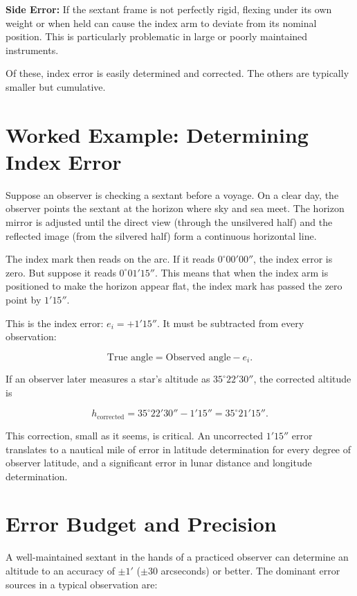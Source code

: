 \textbf{Side Error:} If the sextant frame is not perfectly rigid, flexing under its own weight or when held can cause the index arm to deviate from its nominal position. This is particularly problematic in large or poorly maintained instruments.

Of these, index error is easily determined and corrected. The others are typically smaller but cumulative.

\section{Worked Example: Determining Index Error}

Suppose an observer is checking a sextant before a voyage. On a clear day, the observer points the sextant at the horizon where sky and sea meet. The horizon mirror is adjusted until the direct view (through the unsilvered half) and the reflected image (from the silvered half) form a continuous horizontal line.

The index mark then reads on the arc. If it reads $0^{\circ} 00' 00''$, the index error is zero. But suppose it reads $0^{\circ} 01' 15''$. This means that when the index arm is positioned to make the horizon appear flat, the index mark has passed the zero point by $1' 15''$.

This is the index error: $e_i = +1' 15''$. It must be subtracted from every observation:

\[
  \text{True angle} = \text{Observed angle} - e_i.
\]

If an observer later measures a star's altitude as $35^{\circ} 22' 30''$, the corrected altitude is

\[
  h_{\text{corrected}} = 35^{\circ} 22' 30'' - 1' 15'' = 35^{\circ} 21' 15''.
\]

This correction, small as it seems, is critical. An uncorrected $1' 15''$ error translates to a nautical mile of error in latitude determination for every degree of observer latitude, and a significant error in lunar distance and longitude determination.

\section{Error Budget and Precision}

A well-maintained sextant in the hands of a practiced observer can determine an altitude to an accuracy of $\pm 1' $ ($\pm 30$ arcseconds) or better. The dominant error sources in a typical observation are:

